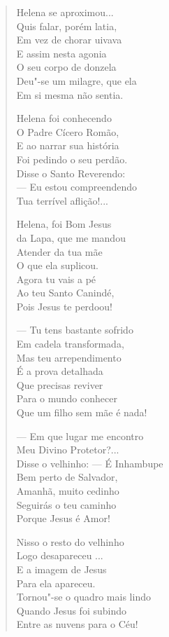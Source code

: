 \begin{verse}
Helena se aproximou... \\
Quis falar, porém latia, \\
Em vez de chorar uivava \\
E assim nesta agonia \\
O seu corpo de donzela \\
Deu"-se um milagre, que ela \\
Em si mesma não sentia. 


Helena foi conhecendo \\
O Padre Cícero Romão, \\
E ao narrar sua história \\
Foi pedindo o seu perdão. \\
Disse o Santo Reverendo: \\
--- Eu estou compreendendo \\
Tua terrível aflição!... 

Helena, foi Bom Jesus \\
da Lapa, que me mandou \\
Atender da tua mãe \\
O que ela suplicou. \\
Agora tu vais a pé \\
Ao teu Santo Canindé, \\
Pois Jesus te perdoou! 

--- Tu tens bastante sofrido \\
Em cadela transformada, \\
Mas teu arrependimento \\
É a prova detalhada \\
Que precisas reviver \\
Para o mundo conhecer \\
Que um filho sem mãe é nada! 

--- Em que lugar me encontro \\
Meu Divino Protetor?... \\
Disse o velhinho: --- É Inhambupe \\
Bem perto de Salvador, \\
Amanhã, muito cedinho \\
Seguirás o teu caminho \\
Porque Jesus é Amor! 


Nisso o resto do velhinho \\
Logo desapareceu ... \\
E a imagem de Jesus \\
Para ela apareceu. \\
Tornou"-se o quadro mais lindo \\
Quando Jesus foi subindo \\
Entre as nuvens para o Céu! 


\end{verse}
